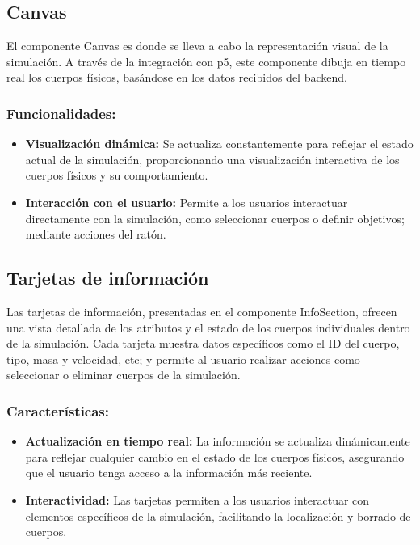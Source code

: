 \subsection{Canvas}
El componente Canvas es donde se lleva a cabo la representación visual de la simulación. A través de la integración con p5, este componente dibuja en tiempo real los cuerpos físicos, basándose en los datos recibidos del backend.
\subsubsection{Funcionalidades:}
\begin{itemize}
    \item \textbf{Visualización dinámica:} Se actualiza constantemente para reflejar el estado actual de la simulación, proporcionando una visualización interactiva de los cuerpos físicos y su comportamiento.
    \item \textbf{Interacción con el usuario:} Permite a los usuarios interactuar directamente con la simulación, como seleccionar cuerpos o definir objetivos; mediante acciones del ratón.
\end{itemize}
\subsection{Tarjetas de información}
Las tarjetas de información, presentadas en el componente InfoSection, ofrecen una vista detallada de los atributos y el estado de los cuerpos individuales dentro de la simulación. Cada tarjeta muestra datos específicos como el ID del cuerpo, tipo, masa y velocidad, etc; y permite al usuario realizar acciones como seleccionar o eliminar cuerpos de la simulación.
\subsubsection{Características:}
\begin{itemize}
    \item \textbf{Actualización en tiempo real:} La información se actualiza dinámicamente para reflejar cualquier cambio en el estado de los cuerpos físicos, asegurando que el usuario tenga acceso a la información más reciente.
    \item \textbf{Interactividad:} Las tarjetas permiten a los usuarios interactuar con elementos específicos de la simulación, facilitando la localización y borrado de cuerpos.
\end{itemize}